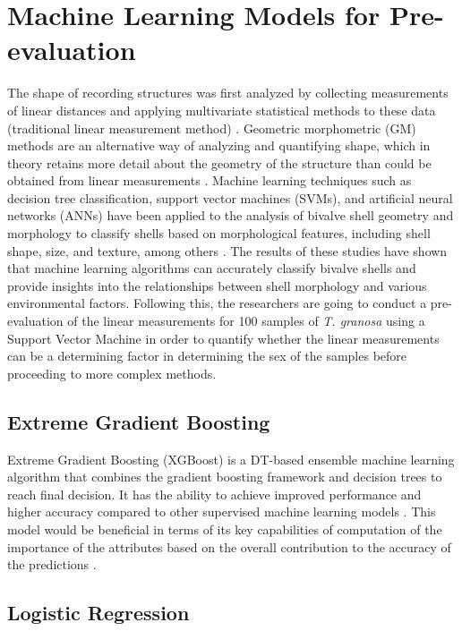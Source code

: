\section{Machine Learning Models for Pre-evaluation }
\label{sec:ml models}

The shape of recording structures was first analyzed by collecting measurements of linear distances and applying multivariate statistical methods to these data (traditional linear measurement method) \cite{rohlf1984}. Geometric morphometric (GM) methods are an alternative way of analyzing and quantifying shape, which in theory retains more detail about the geometry of the structure than could be obtained from linear measurements \cite{adams2004}. Machine learning techniques such as decision tree classification, support vector machines (SVMs), and artificial neural networks (ANNs) have been applied to the analysis of bivalve shell geometry and morphology to classify shells based on morphological features, including shell shape, size, and texture, among others \cite{kiel2021}. The results of these studies have shown that machine learning algorithms can accurately classify bivalve shells and provide insights into the relationships between shell morphology and various environmental factors.
Following this, the researchers are going to conduct a pre-evaluation of the linear measurements for 100 samples of \textit{T. granosa} using a Support Vector Machine in order to quantify whether the linear measurements can be a determining factor in determining the sex of the samples before proceeding to more complex methods. 

\subsection{Extreme Gradient Boosting}
Extreme Gradient Boosting (XGBoost) is a DT-based ensemble machine learning algorithm that combines the gradient boosting framework and decision trees to reach final decision. It has the ability to achieve improved performance and higher accuracy compared to other supervised machine learning models . This model would be beneficial in terms of its key capabilities of computation of the importance of the attributes based on the overall contribution to the accuracy of the predictions \cite{torres2023}. 

\subsection{Logistic Regression}

